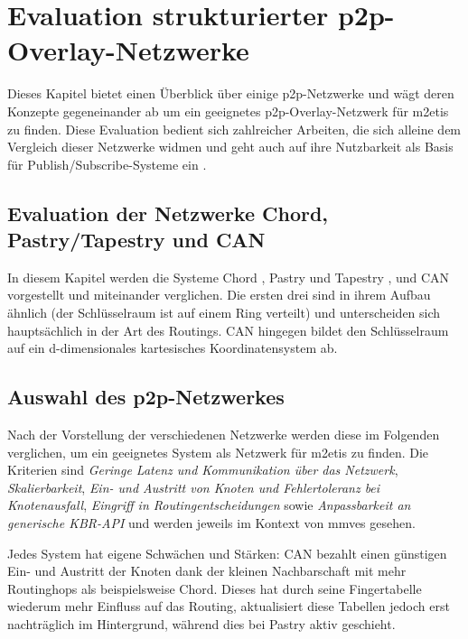 \chapter{Evaluation strukturierter p2p-Overlay-Netzwerke}
\label{chap:evaluation_p2p}

Dieses Kapitel bietet einen Überblick über einige p2p-Netzwerke und wägt deren Konzepte gegeneinander ab um ein geeignetes p2p-Overlay-Netzwerk für \ac{m2etis} zu finden. Diese Evaluation bedient sich zahlreicher Arbeiten, die sich alleine dem Vergleich dieser Netzwerke widmen \cite{Lua2005Survey, Goetz2005, Li2004Comparing, Darlagiannis2006Peertopeer, Castro2002Secure, Bo2003PeertoPeer} und geht auch auf ihre Nutzbarkeit als Basis für Publish/Subscribe-Systeme ein \cite{Hosseini2007Survey, Fahmy2007, Castro2003Evaluation, Ratnasamy2001}.

\section[Evaluation dreier p2p-Netzwerke]{Evaluation der Netzwerke Chord, Pastry/Tapestry und CAN}
In diesem Kapitel werden die Systeme Chord \cite{Stoica2003}, Pastry \cite{Rowstron2001} und Tapestry \cite{Zhao2001Tapestry,Zhao2004Tapestry}, und CAN \cite{Ratnasamy2001Scalable} vorgestellt und miteinander verglichen. Die ersten drei sind in ihrem Aufbau ähnlich (der Schlüsselraum ist auf einem Ring verteilt) und unterscheiden sich hauptsächlich in der Art des Routings. CAN hingegen bildet den Schlüsselraum auf ein d-dimensionales kartesisches Koordinatensystem ab. 





\section{Auswahl des p2p-Netzwerkes}
Nach der Vorstellung der verschiedenen Netzwerke werden diese im Folgenden verglichen, um ein geeignetes System als Netzwerk für \ac{m2etis} zu finden. Die Kriterien sind \emph{Geringe Latenz und Kommunikation über das Netzwerk}, \emph{Skalierbarkeit}, \emph{Ein- und Austritt von Knoten und Fehlertoleranz bei Knotenausfall}, \emph{Eingriff in Routingentscheidungen} sowie \emph{Anpassbarkeit an generische KBR-API} und werden jeweils im Kontext von \acp{mmve} gesehen.

Jedes System hat eigene Schwächen und Stärken: CAN bezahlt einen günstigen Ein- und Austritt der Knoten dank der kleinen Nachbarschaft mit mehr Routinghops als beispielsweise Chord. Dieses hat durch seine Fingertabelle wiederum mehr Einfluss auf das Routing, aktualisiert diese Tabellen jedoch erst nachträglich im Hintergrund, während dies bei Pastry aktiv geschieht.

